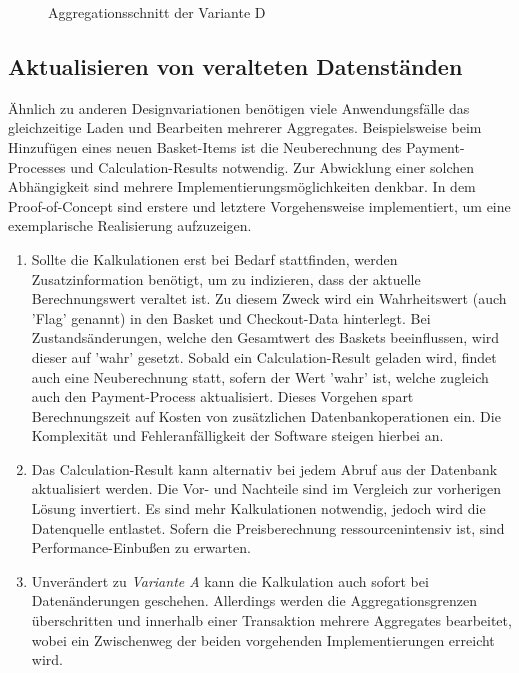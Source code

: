 \begin{figure}[htbp]
	\centering
	
	\caption{Aggregationsschnitt der Variante D}
	\label{fig:VarD}
\end{figure}

\subsection{Aktualisieren von veralteten Datenständen}

Ähnlich zu anderen Designvariationen benötigen viele Anwendungsfälle das gleichzeitige Laden und Bearbeiten mehrerer Aggregates. Beispielsweise beim Hinzufügen eines neuen Basket-Items ist die Neuberechnung des Payment-Processes und Calculation-Results notwendig. Zur Abwicklung einer solchen Abhängigkeit sind mehrere Implementierungsmöglichkeiten denkbar. In dem Proof-of-Concept sind erstere und letztere Vorgehensweise implementiert, um eine exemplarische Realisierung aufzuzeigen.

\begin{enumerate}[topsep=-2pt]
	\item { Sollte die Kalkulationen erst bei Bedarf stattfinden, werden Zusatzinformation benötigt, um zu indizieren, dass der aktuelle Berechnungswert veraltet ist. Zu diesem Zweck wird ein Wahrheitswert (auch 'Flag' genannt) in den Basket und Checkout-Data hinterlegt. Bei Zustandsänderungen, welche den Gesamtwert des Baskets beeinflussen, wird dieser auf 'wahr' gesetzt. Sobald ein Calculation-Result geladen wird, findet auch eine Neuberechnung statt, sofern der Wert 'wahr' ist, welche zugleich auch den Payment-Process aktualisiert. Dieses Vorgehen spart Berechnungszeit auf Kosten von zusätzlichen Datenbankoperationen ein. Die Komplexität und Fehleranfälligkeit der Software steigen hierbei an.  }
	\item { Das Calculation-Result kann alternativ bei jedem Abruf aus der Datenbank aktualisiert werden. Die Vor- und Nachteile sind im Vergleich zur vorherigen Lösung invertiert. Es sind mehr Kalkulationen notwendig, jedoch wird die Datenquelle entlastet. Sofern die Preisberechnung ressourcenintensiv ist, sind Performance-Einbußen zu erwarten.  }
	\item { Unverändert zu \emph{Variante A} kann die Kalkulation auch sofort bei Datenänderungen geschehen. Allerdings werden die Aggregationsgrenzen überschritten und innerhalb einer Transaktion mehrere Aggregates bearbeitet, wobei ein Zwischenweg der beiden vorgehenden Implementierungen erreicht wird.  }
\end{enumerate}



